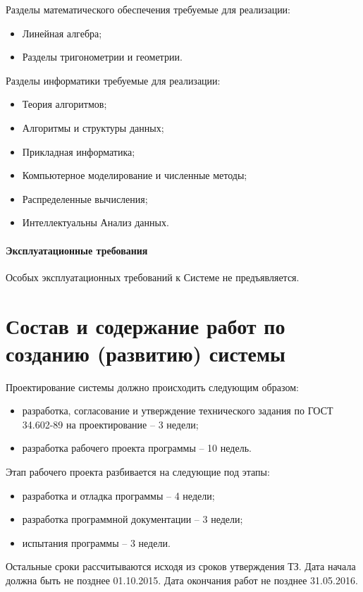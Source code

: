 Разделы математического обеспечения требуемые для реализации:
\begin{itemize}
    \item Линейная алгебра;
    \item Разделы тригонометрии и геометрии.
\end{itemize}

Разделы информатики требуемые для реализации:
\begin{itemize}
    \item Теория алгоритмов;
    \item Алгоритмы и структуры данных;
    \item Прикладная информатика;
    \item Компьютерное моделирование и численные методы;
    \item Распределенные вычисления;
    \item Интеллектуальны Анализ данных.
\end{itemize}

\subsubsection{Эксплуатационные требования}
Особых эксплуатационных требований к Системе не предъявляется.

\vspace{3em}
\chapter{Состав и содержание работ по созданию (развитию) системы}
Проектирование системы должно происходить следующим образом:
\begin{itemize}
    \item разработка, согласование и утверждение технического задания по ГОСТ 34.602-89 на 
        проектирование -- 3 недели;
    \item разработка рабочего проекта программы -- 10 недель.
\end{itemize}

Этап рабочего проекта разбивается на следующие под этапы:
\begin{itemize}
    \item разработка и отладка программы -- 4 недели;
    \item разработка программной документации -- 3 недели;
    \item испытания программы -- 3 недели.
\end{itemize}

Остальные сроки рассчитываются исходя из сроков утверждения ТЗ. Дата начала должна быть не позднее 
01.10.2015. Дата окончания работ не позднее 31.05.2016.

